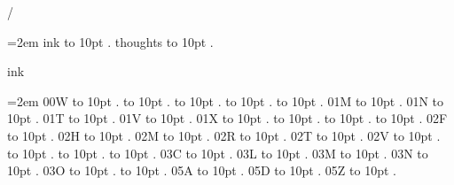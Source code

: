 
\parindent=0pt
\pdfpagewidth=148mm
\pdfpageheight=210mm
\hsize=128mm
\vsize=190mm
\pdfhorigin=0pt
\pdfvorigin=0pt
\hoffset=10mm
\voffset=10mm
/
\par\begingroup
\leftskip=2em
\smallskip
ink \leaders\hbox to 10pt {\hss.\hss}  \hfill {}
\smallskip
thoughts \leaders\hbox to 10pt {\hss.\hss}  \hfill {}
\smallskip
\medskip
\par\endgroup
\bigskip
{}
ink
\par\begingroup
\leftskip=2em
\smallskip
\medskip
00W \leaders\hbox to 10pt {\hss.\hss}  \hfill {}
 \leaders\hbox to 10pt {\hss.\hss}  \hfill {}
 \leaders\hbox to 10pt {\hss.\hss}  \hfill {}
 \leaders\hbox to 10pt {\hss.\hss}  \hfill {}
 \leaders\hbox to 10pt {\hss.\hss}  \hfill {}
\smallskip
01M \leaders\hbox to 10pt {\hss.\hss}  \hfill {}
\smallskip
01N \leaders\hbox to 10pt {\hss.\hss}  \hfill {}
\smallskip
01T \leaders\hbox to 10pt {\hss.\hss}  \hfill {}
\smallskip
01V \leaders\hbox to 10pt {\hss.\hss}  \hfill {}
\smallskip
01X \leaders\hbox to 10pt {\hss.\hss}  \hfill {}
 \leaders\hbox to 10pt {\hss.\hss}  \hfill {}
 \leaders\hbox to 10pt {\hss.\hss}  \hfill {}
 \leaders\hbox to 10pt {\hss.\hss}  \hfill {}
\smallskip
02F \leaders\hbox to 10pt {\hss.\hss}  \hfill {}
\smallskip
02H \leaders\hbox to 10pt {\hss.\hss}  \hfill {}
\smallskip
02M \leaders\hbox to 10pt {\hss.\hss}  \hfill {}
\smallskip
02R \leaders\hbox to 10pt {\hss.\hss}  \hfill {}
\smallskip
02T \leaders\hbox to 10pt {\hss.\hss}  \hfill {}
\smallskip
02V \leaders\hbox to 10pt {\hss.\hss}  \hfill {}
 \leaders\hbox to 10pt {\hss.\hss}  \hfill {}
 \leaders\hbox to 10pt {\hss.\hss}  \hfill {}
 \leaders\hbox to 10pt {\hss.\hss}  \hfill {}
\smallskip
03C \leaders\hbox to 10pt {\hss.\hss}  \hfill {}
\smallskip
03L \leaders\hbox to 10pt {\hss.\hss}  \hfill {}
\smallskip
03M \leaders\hbox to 10pt {\hss.\hss}  \hfill {}
\smallskip
03N \leaders\hbox to 10pt {\hss.\hss}  \hfill {}
\smallskip
03O \leaders\hbox to 10pt {\hss.\hss}  \hfill {}
 \leaders\hbox to 10pt {\hss.\hss}  \hfill {}
\smallskip
05A \leaders\hbox to 10pt {\hss.\hss}  \hfill {}
\smallskip
05D \leaders\hbox to 10pt {\hss.\hss}  \hfill {}
\smallskip
05Z \leaders\hbox to 10pt {\hss.\hss}  \hfill {}
